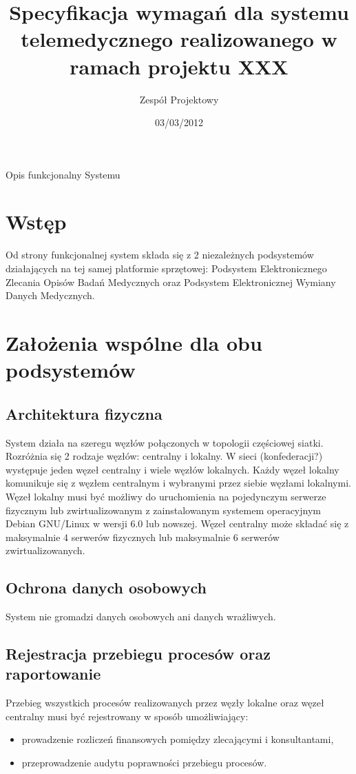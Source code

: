 \documentclass[a4paper]{article}
\title{Specyfikacja wymagań dla systemu telemedycznego realizowanego w ramach projektu XXX}
\author{Zespół Projektowy}
\date{03/03/2012}
\begin{document}
Opis funkcjonalny Systemu

\section{Wstęp}

Od strony funkcjonalnej system składa się z 2 niezależnych podsystemów działających na 
tej samej platformie sprzętowej: Podsystem Elektronicznego Zlecania Opisów Badań 
Medycznych oraz Podsystem Elektronicznej Wymiany Danych Medycznych. 

\section{Założenia wspólne dla obu podsystemów}

\subsection{Architektura fizyczna }

System działa na szeregu węzłów połączonych w topologii częściowej siatki. Rozróżnia się 
2 rodzaje węzłów: centralny i lokalny. W sieci (konfederacji?) występuje jeden węzeł 
centralny i wiele węzłów lokalnych. Każdy węzeł lokalny komunikuje się z węzłem 
centralnym i wybranymi przez siebie węzłami lokalnymi. Węzeł lokalny musi być możliwy 
do uruchomienia na pojedynczym serwerze fizycznym lub zwirtualizowanym z zainstalowanym 
systemem operacyjnym Debian GNU/Linux w wersji 6.0 lub nowszej. Węzeł centralny może 
składać się z maksymalnie 4 serwerów fizycznych lub maksymalnie 6 serwerów zwirtualizowanych. 

\subsection{Ochrona danych osobowych}

System nie gromadzi danych osobowych ani danych wrażliwych.

\subsection{Rejestracja przebiegu procesów oraz raportowanie}

Przebieg wszystkich procesów realizowanych przez węzły lokalne oraz węzeł 
centralny musi być rejestrowany w sposób umożliwiający: 
\begin{itemize}
  \item prowadzenie rozliczeń finansowych pomiędzy zlecającymi i konsultantami,
  \item przeprowadzenie audytu poprawności przebiegu procesów.
\end{itemize}
\end{document}
